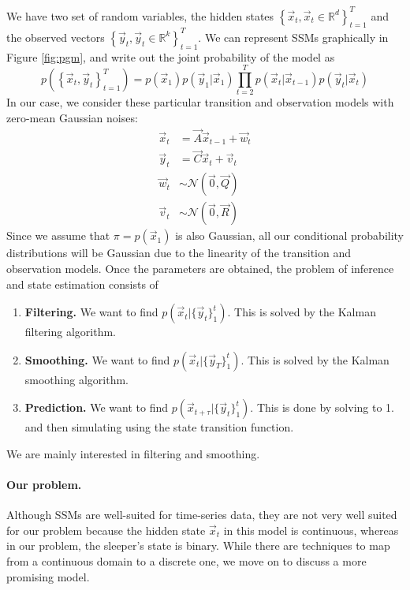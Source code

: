 	We have two set of random variables, the hidden states $\left\{ \vec{x}_t,\vec{x}_t \in \mathbb{R}^d \right\}_{t = 1}^{T}$ and the observed vectors $\left\{ \vec{y}_t, \vec{y}_t \in \mathbb{R}^k \right\}_{t = 1}^{T}$. We can represent SSMs graphically in Figure \ref{fig:pgm}, and write out the joint probability of the model as
	\begin{equation}
		p\left( \left\{ \vec x_t, \vec y_t \right\}_{t = 1}^{T} \right) = p(\vec x_1) p(\vec y_1 | \vec x_1) \prod_{t = 2}^{T} {p(\vec x_t | \vec x_{t - 1}) p(\vec y_t | \vec x_t)}
	\end{equation}
In our case, we consider these particular transition and observation models with zero-mean Gaussian noises:
	\begin{align}
		\vec x_t & = \vec A \vec x_{t - 1} + \vec w_t\\
		\vec y_t & = \vec C \vec x_t + \vec v_t \\
		\vec w_t & \sim \mathcal{N} (\vec 0, \vec Q) \\
		\vec v_t & \sim \mathcal{N} (\vec 0, \vec R)
	\end{align}
Since we assume that $\pi = p(\vec x_1)$ is also Gaussian, all our conditional probability distributions will be Gaussian due to the linearity of the transition and observation models. Once the parameters are obtained, the problem of inference and state estimation consists of	
	\begin{enumerate}
		\item \textbf{Filtering.} We want to find $p(\vec x_t | \{\vec y_t\}_1^t)$. This is solved by the Kalman filtering algorithm.
		\item \textbf{Smoothing.} We want to find $p(\vec x_t | \{\vec y_T\}_1^t)$. This is solved by the Kalman smoothing algorithm.
		\item \textbf{Prediction.} We want to find $p(\vec x_{t + \tau} | \{\vec y_t\}_1^t)$. This is done by solving to 1. and then simulating using the state transition function.
	\end{enumerate}
We are mainly interested in filtering and smoothing.

\paragraph{Our problem.} Although SSMs are well-suited for time-series data, they are not very well suited for our problem because the hidden state $\vec x_t$ in this model is continuous, whereas in our problem, the sleeper's state is binary. While there are techniques to map from a continuous domain to a discrete one, we move on to discuss a more promising model.